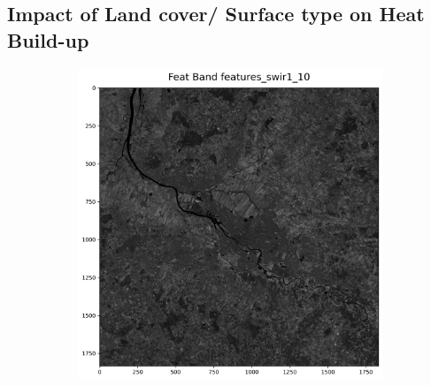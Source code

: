 \documentclass[12pt,a4paper, english,twoside]{scrartcl}
\begin{document}
    \subsection{Impact of Land cover/ Surface type on Heat Build-up}
      \begin{figure}
        \centering
        \begin{subfigure}[b]{0.38\textwidth}
          \includegraphics[width=\textwidth]{img/Features_swir10.png}
        \end{subfigure}


\end{figure}
\end{document}
